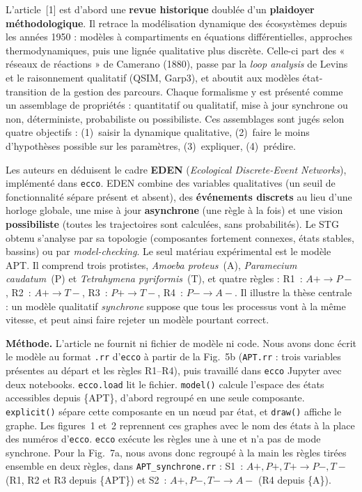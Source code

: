 \documentclass[10pt,a4paper]{article}
\newcommand{\titre}[1]{\par\vspace{0.5em}{\large\bfseries #1}\par\vspace{0.15em}}
\newcommand{\ecco}{\texttt{ecco}}
\begin{document}
\titre{1. De quoi parle l'article ?}
L'article~[1] est d'abord une \textbf{revue historique} doublée d'un \textbf{plaidoyer méthodologique}. Il retrace la modélisation dynamique des écosystèmes depuis les années 1950 : modèles à compartiments en équations différentielles, approches thermodynamiques, puis une lignée qualitative plus discrète. Celle-ci part des « réseaux de réactions » de Camerano (1880), passe par la \emph{loop analysis} de Levins et le raisonnement qualitatif (QSIM, Garp3), et aboutit aux modèles état-transition de la gestion des parcours. Chaque formalisme y est présenté comme un assemblage de propriétés : quantitatif ou qualitatif, mise à jour synchrone ou non, déterministe, probabiliste ou possibiliste. Ces assemblages sont jugés selon quatre objectifs : (1)~saisir la dynamique qualitative, (2)~faire le moins d'hypothèses possible sur les paramètres, (3)~expliquer, (4)~prédire.

Les auteurs en déduisent le cadre \textbf{EDEN} (\emph{Ecological Discrete-Event Networks}), implémenté dans \ecco. EDEN combine des variables qualitatives (un seuil de fonctionnalité sépare présent et absent), des \textbf{événements discrets} au lieu d'une horloge globale, une mise à jour \textbf{asynchrone} (une règle à la fois) et une vision \textbf{possibiliste} (toutes les trajectoires sont calculées, sans probabilités). Le STG obtenu s'analyse par sa topologie (composantes fortement connexes, états stables, bassins) ou par \emph{model-checking}. Le seul matériau expérimental est le modèle APT. Il comprend trois protistes, \emph{Amoeba proteus}~(A), \emph{Paramecium caudatum}~(P) et \emph{Tetrahymena pyriformis}~(T), et quatre règles : R1~: $A{+}\to P{-}$, R2~: $A{+}\to T{-}$, R3~: $P{+}\to T{-}$, R4~: $P{-}\to A{-}$. Il illustre la thèse centrale : un modèle qualitatif \emph{synchrone} suppose que tous les processus vont à la même vitesse, et peut ainsi faire rejeter un modèle pourtant correct.

\titre{2. Quelles réponses, avec quelle confiance ?}
\textbf{Méthode.} L'article ne fournit ni fichier de modèle ni code. Nous avons donc écrit le modèle au format \texttt{.rr} d'\ecco{} à partir de la Fig.~5b (\texttt{APT.rr} : trois variables présentes au départ et les règles R1--R4), puis travaillé dans \ecco{} Jupyter avec deux notebooks. \texttt{ecco.load} lit le fichier. \texttt{model()} calcule l'espace des états accessibles depuis \{APT\}, d'abord regroupé en une seule composante. \texttt{explicit()} sépare cette composante en un nœud par état, et \texttt{draw()} affiche le graphe. Les figures~1 et~2 reprennent ces graphes avec le nom des états à la place des numéros d'\ecco. \ecco{} exécute les règles une à une et n'a pas de mode synchrone. Pour la Fig.~7a, nous avons donc regroupé à la main les règles tirées ensemble en deux règles, dans \texttt{APT\_synchrone.rr} : S1~: $A{+},P{+},T{+}\to P{-},T{-}$ (R1, R2 et R3 depuis \{APT\}) et S2~: $A{+},P{-},T{-}\to A{-}$ (R4 depuis \{A\}).
\end{document}
